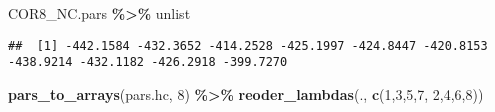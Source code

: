 \documentclass[
]{article}
\newenvironment{Shaded}{\begin{snugshade}}{\end{snugshade}}
\newcommand{\DecValTok}[1]{\textcolor[rgb]{0.00,0.00,0.81}{#1}}
\newcommand{\FunctionTok}[1]{\textcolor[rgb]{0.13,0.29,0.53}{\textbf{#1}}}
\newcommand{\NormalTok}[1]{#1}
\newcommand{\SpecialCharTok}[1]{\textcolor[rgb]{0.81,0.36,0.00}{\textbf{#1}}}
\begin{document}
\begin{Shaded}
\begin{Highlighting}[]
\NormalTok{COR8\_NC.pars }\SpecialCharTok{\%\textgreater{}\%}\NormalTok{ unlist}
\end{Highlighting}
\end{Shaded}

\begin{verbatim}
##  [1] -442.1584 -432.3652 -414.2528 -425.1997 -424.8447 -420.8153 -438.9214 -432.1182 -426.2918 -399.7270
\end{verbatim}

\begin{Shaded}
\begin{Highlighting}[]
\FunctionTok{pars\_to\_arrays}\NormalTok{(pars.hc, }\DecValTok{8}\NormalTok{) }\SpecialCharTok{\%\textgreater{}\%} \FunctionTok{reoder\_lambdas}\NormalTok{(., }\FunctionTok{c}\NormalTok{(}\DecValTok{1}\NormalTok{,}\DecValTok{3}\NormalTok{,}\DecValTok{5}\NormalTok{,}\DecValTok{7}\NormalTok{, }\DecValTok{2}\NormalTok{,}\DecValTok{4}\NormalTok{,}\DecValTok{6}\NormalTok{,}\DecValTok{8}\NormalTok{))}
\end{Highlighting}
\end{Shaded}
\end{document}
